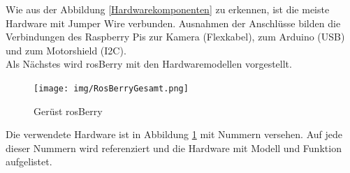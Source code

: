 \documentclass[conference]{IEEEtran}
\begin{document}
Wie aus der Abbildung \ref{Hardwarekomponenten} zu erkennen, ist die meiste Hardware mit Jumper Wire verbunden.
Ausnahmen der Anschlüsse bilden die Verbindungen des Raspberry Pis zur Kamera (Flexkabel), zum Arduino (USB) und zum Motorshield (I2C).
\\

Als Nächstes wird rosBerry mit den Hardwaremodellen vorgestellt.
\\
\begin{figure}[!ht]
	\centering
	\texttt{[image: img/RosBerryGesamt.png]}
	\caption{Gerüst rosBerry}
	\label{rosBerryGesamt}
\end{figure}

Die verwendete Hardware ist in Abbildung \ref{rosBerryGesamt} mit Nummern versehen.
Auf jede dieser Nummern wird referenziert und die Hardware mit Modell und Funktion aufgelistet.
\end{document}
